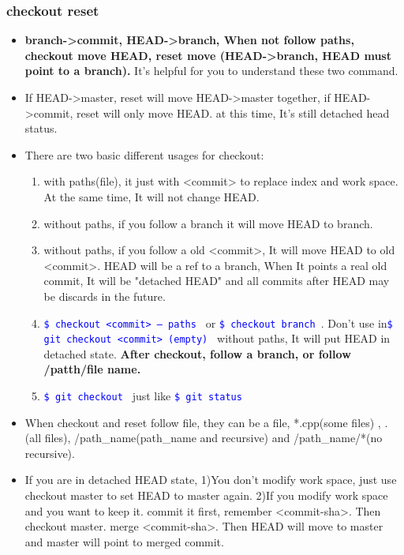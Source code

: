 \documentclass[a4paper,11pt,twoside]{book}
\newcommand{\linuxcommand}[1]{\texttt{\textcolor{blue}{\$ #1 \Pisymbol{psy}{191}}}}
\begin{document}
\subsubsection{checkout reset}

\begin{itemize}
		\item \textbf{branch->commit, HEAD->branch, When not follow paths, checkout move HEAD, reset move (HEAD->branch, HEAD must point to a branch). } It's helpful for you to understand these two command.
		
		\item If HEAD->master, reset will move HEAD->master together, if HEAD->commit, reset will only move HEAD. at this time, It's still detached head status. 
		
		\item There are two basic different usages for checkout: 
		\begin{enumerate}
		\item with paths(file), it just with <commit> to replace index and work space. At the same time, It will not change HEAD. 
		\item without paths, if you follow a branch it will move HEAD to branch.
		\item without paths, if you follow a old <commit>, It will move HEAD to old <commit>. HEAD will be a ref to a branch,  When It points a real old commit, It will be "detached HEAD" and all commits after HEAD may be discards in the future. 
		\item \linuxcommand{checkout <commit> -- paths} or \linuxcommand{checkout branch}. Don't use in\linuxcommand{git checkout <commit> (empty)} without paths, It will put HEAD in detached state. \textbf{After checkout, follow a branch, or follow /patth/file name.}
		\item \linuxcommand{git checkout} just like \linuxcommand{git status}
		\end{enumerate}
				
		\item When checkout and reset follow file, they can be a file, *.cpp(some files) , . (all files),  /path\_name(path\_name and recursive) and /path\_name/*(no recursive). 

	 \item If you are in detached HEAD state, 1)You don't modify work space, just use checkout master to set HEAD to master again. 2)If you modify work space and you want to keep it. commit it first, remember <commit-sha>. Then checkout master. merge <commit-sha>. Then HEAD will move to master and master will point to merged commit.  
	 

\end{itemize}
\end{document}
